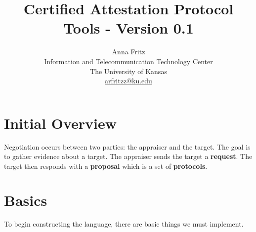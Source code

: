 \documentclass[10pt]{article}
\title{Certified Attestation Protocol Tools - Version 0.1}
\author{Anna Fritz \\
  Information and Telecommunication Technology Center \\
  The University of Kansas \\
  \url{arfritzz@ku.edu}
}
\begin{document}
\section {Initial Overview}

  Negotiation occurs between two parties: the appraiser and the target. The goal is to gather evidence about a target.
  The appraiser sends the target a \textbf{request}. The target then responds
  with a \textbf{proposal} which is a set of \textbf{protocols}.

\section {Basics}

To begin constructing the language, there are basic things we must implement. 
\end{document}
